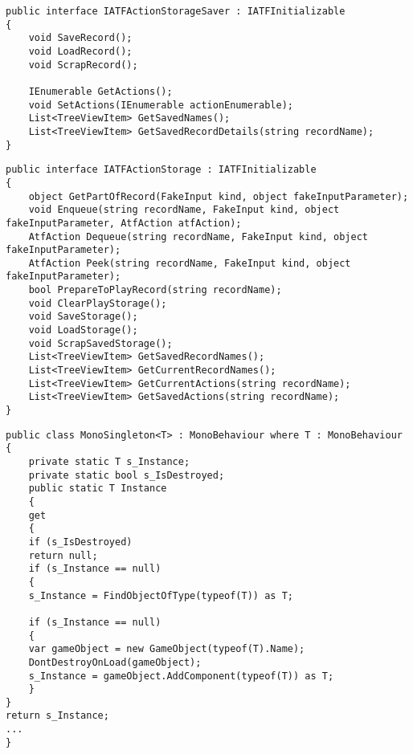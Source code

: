 \begin{lstlisting}[caption={Интерфейс модуля загрузчика хранилища записей},label=iSaver]
public interface IATFActionStorageSaver : IATFInitializable
{
	void SaveRecord();
	void LoadRecord();
	void ScrapRecord();
	
	IEnumerable GetActions();
	void SetActions(IEnumerable actionEnumerable);
	List<TreeViewItem> GetSavedNames();
	List<TreeViewItem> GetSavedRecordDetails(string recordName);
}
\end{lstlisting}

\begin{lstlisting}[caption={Интерфейс модуля хранилища записей},label=iStorage]
public interface IATFActionStorage : IATFInitializable
{
	object GetPartOfRecord(FakeInput kind, object fakeInputParameter);
	void Enqueue(string recordName, FakeInput kind, object fakeInputParameter, AtfAction atfAction);
	AtfAction Dequeue(string recordName, FakeInput kind, object fakeInputParameter);
	AtfAction Peek(string recordName, FakeInput kind, object fakeInputParameter);
	bool PrepareToPlayRecord(string recordName);
	void ClearPlayStorage();
	void SaveStorage();
	void LoadStorage();
	void ScrapSavedStorage();
	List<TreeViewItem> GetSavedRecordNames();
	List<TreeViewItem> GetCurrentRecordNames();
	List<TreeViewItem> GetCurrentActions(string recordName);
	List<TreeViewItem> GetSavedActions(string recordName);
}
\end{lstlisting}

\begin{lstlisting}[caption={Бизнес-логика MonoSingleton<T>},label=monoSingleton]
public class MonoSingleton<T> : MonoBehaviour where T : MonoBehaviour
{
	private static T s_Instance;
	private static bool s_IsDestroyed;
	public static T Instance
	{
	get
	{
	if (s_IsDestroyed)
	return null;
	if (s_Instance == null)
	{
	s_Instance = FindObjectOfType(typeof(T)) as T;
	
	if (s_Instance == null)
	{
	var gameObject = new GameObject(typeof(T).Name); 
	DontDestroyOnLoad(gameObject);
	s_Instance = gameObject.AddComponent(typeof(T)) as T;
	}
}
return s_Instance;
...
}
\end{lstlisting}

